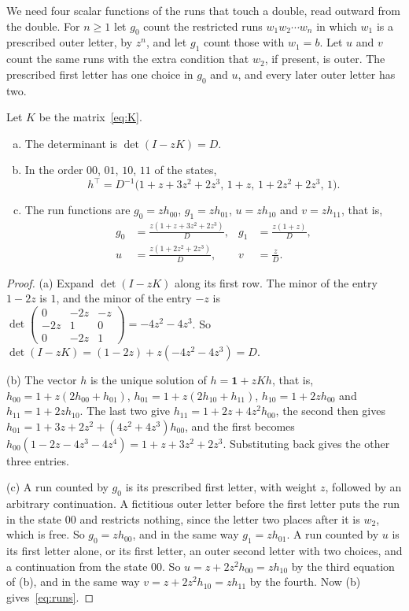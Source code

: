 We need four scalar functions of the runs that touch a double, read outward from the double.
For $n\ge1$ let $g_0$ count the restricted runs $w_1w_2\cdots w_n$ in which $w_1$ is a
prescribed outer letter, by $z^n$, and let $g_1$ count those with $w_1=b$. Let $u$ and $v$
count the same runs with the extra condition that $w_2$, if present, is outer. The prescribed
first letter has one choice in $g_0$ and $u$, and every later outer letter has two.

\begin{proposition}\label{prop:threeblock}
Let $K$ be the matrix~\eqref{eq:K}.
\begin{enumerate}[(a)]
\item The determinant is $\det(I-zK)=D$.
\item In the order $00$, $01$, $10$, $11$ of the states,
\[
h^{\top}=D^{-1}\bigl(1+z+3z^2+2z^3,\,1+z,\,1+2z^2+2z^3,\,1\bigr).
\]
\item The run functions are $g_0=zh_{00}$, $g_1=zh_{01}$, $u=zh_{10}$ and $v=zh_{11}$, that is,
\begin{equation}\label{eq:runs}
\begin{aligned}
g_0&=\frac{z(1+z+3z^2+2z^3)}D,& g_1&=\frac{z(1+z)}D,\\
u&=\frac{z(1+2z^2+2z^3)}D,& v&=\frac zD.
\end{aligned}
\end{equation}
\end{enumerate}
\end{proposition}

\begin{proof}
(a) Expand $\det(I-zK)$ along its first row. The minor of the entry $1-2z$ is $1$, and the
minor of the entry $-z$ is
$\det\begin{pmatrix}0&-2z&-z\\-2z&1&0\\0&-2z&1\end{pmatrix}=-4z^2-4z^3$. So
$\det(I-zK)=(1-2z)+z(-4z^2-4z^3)=D$.

(b) The vector $h$ is the unique solution of $h=\mathbf1+zKh$, that is,
$h_{00}=1+z(2h_{00}+h_{01})$, $h_{01}=1+z(2h_{10}+h_{11})$, $h_{10}=1+2zh_{00}$ and
$h_{11}=1+2zh_{10}$. The last two give $h_{11}=1+2z+4z^2h_{00}$, the second then gives
$h_{01}=1+3z+2z^2+(4z^2+4z^3)h_{00}$, and the first becomes
$h_{00}(1-2z-4z^3-4z^4)=1+z+3z^2+2z^3$. Substituting back gives the other three entries.

(c) A run counted by $g_0$ is its prescribed first letter, with weight $z$, followed by an
arbitrary continuation. A fictitious outer letter before the first letter puts the run in the
state $00$ and restricts nothing, since the letter two places after it is $w_2$, which is
free. So $g_0=zh_{00}$, and in the same way $g_1=zh_{01}$. A run counted by $u$ is its first
letter alone, or its first letter, an outer second letter with two choices, and a
continuation from the state $00$. So $u=z+2z^2h_{00}=zh_{10}$ by the third equation of (b),
and in the same way $v=z+2z^2h_{10}=zh_{11}$ by the fourth. Now (b) gives~\eqref{eq:runs}.
\end{proof}

